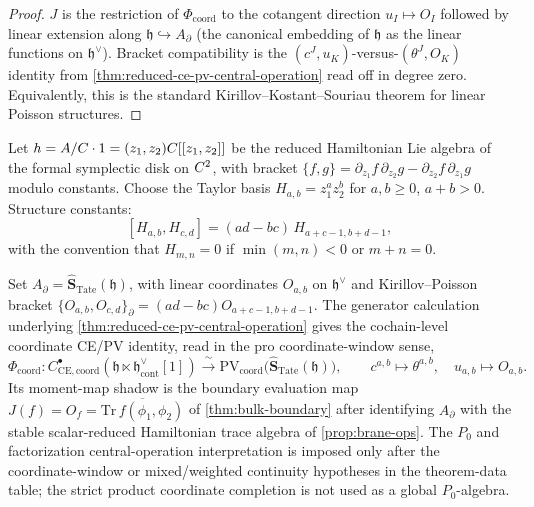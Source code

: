\documentclass[11pt]{memoir}
\begin{document}
\begin{proof}
  $J$ is the restriction of \(\Phi_{\mathrm{coord}}\) to the cotangent direction
  $u_I\mapsto O_I$ followed by linear extension along
  $\mathfrak h\hookrightarrow A_\partial$ (the canonical embedding of
  $\mathfrak h$ as the linear functions on $\mathfrak h^\vee$). Bracket
  compatibility is the $(c^J,u_K)$-versus-$(\theta^J,O_K)$ identity
  from \ref{thm:reduced-ce-pv-central-operation} read off in degree zero.
  Equivalently, this is the standard Kirillov--Kostant--Souriau theorem
  for linear Poisson structures.
\end{proof}

\begin{cor}\label{cor:ce-pv-formal-disk}
  Let $h=A/C\cdot 1=(z_1,z_2)C[[z_1,z_2]]$ be the
  reduced Hamiltonian Lie algebra of the formal symplectic disk on
  $C^2$, with bracket
  $\{f,g\}=\partial_{z_1}f\,\partial_{z_2}g-\partial_{z_2}f\,\partial_{z_1}g$
  modulo constants. Choose the Taylor basis $H_{a,b}=z_1^az_2^b$ for
  $a,b\geq 0$, $a+b>0$. Structure constants:
  $$[H_{a,b},H_{c,d}]=(ad-bc)\,H_{a+c-1,b+d-1},$$
  with the convention that $H_{m,n}=0$ if $\min(m,n)<0$ or $m+n=0$.

  Set $A_\partial=\widehat{\mathbf S}_{\mathrm{Tate}}(\mathfrak h)$,
  with linear coordinates $O_{a,b}$ on $\mathfrak h^\vee$ and
  Kirillov--Poisson bracket
  $\{O_{a,b},O_{c,d}\}_\partial=(ad-bc)O_{a+c-1,b+d-1}$.
  The generator calculation underlying
  \ref{thm:reduced-ce-pv-central-operation} gives the cochain-level
	  coordinate CE/PV identity, read in the pro coordinate-window sense,
	  $$\Phi_{\mathrm{coord}}:C^\bullet_{\mathrm{CE},\mathrm{coord}}(\mathfrak h\ltimes
	    \mathfrak h^\vee_{\mathrm{cont}}[1])\xrightarrow{\ \sim\ }
    \mathrm{PV}_{\mathrm{coord}}
    \bigl(\widehat{\mathbf S}_{\mathrm{Tate}}(\mathfrak h)\bigr),
    \qquad c^{a,b}\mapsto\theta^{a,b},\quad u_{a,b}\mapsto O_{a,b}.$$
  Its moment-map shadow is the boundary evaluation map
  $J(f)=O_f=\overline{\mathrm{Tr}\,f(\phi_1,\phi_2)}$ of
  \ref{thm:bulk-boundary} after identifying $A_\partial$ with the
  stable scalar-reduced Hamiltonian trace algebra of
	  \ref{prop:brane-ops}. The \(P_0\) and factorization central-operation
		  interpretation is imposed only after the coordinate-window or
  mixed/weighted continuity hypotheses in the theorem-data table; the
  strict product coordinate completion is not used as a global
  \(P_0\)-algebra.
\end{cor}
\end{document}
